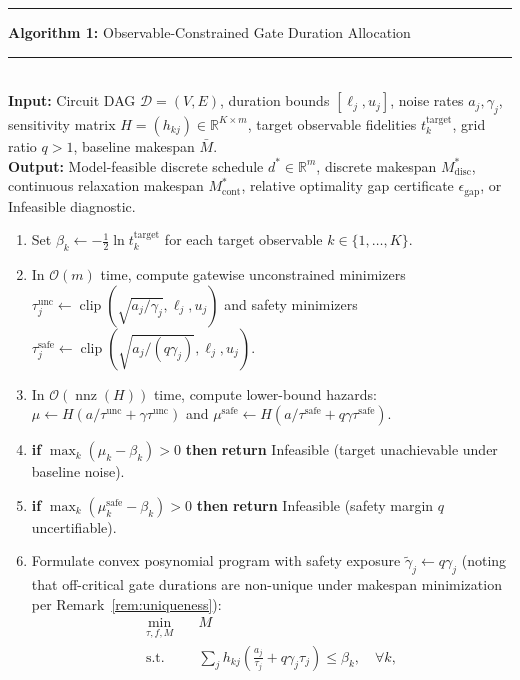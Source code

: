 \documentclass[10pt,letterpaper,journal]{IEEEtran}
\begin{document}
\begin{table}[t]
\hrule\vspace{3pt}
\noindent\textbf{Algorithm 1:} Observable-Constrained Gate Duration Allocation\\[-0.5em]
\rule{\columnwidth}{0.4pt}\\[0.2em]
\footnotesize
\textbf{Input:} Circuit DAG $\mathcal{D}=(V, E)$, duration bounds $[\ell_j, u_j]$, noise rates $a_j, \gamma_j$, sensitivity matrix $H = (h_{kj}) \in \mathbb{R}^{K \times m}$, target observable fidelities $t_k^{\mathrm{target}}$, grid ratio $q > 1$, baseline makespan $\bar{M}$.\\
\textbf{Output:} Model-feasible discrete schedule $d^* \in \mathbb{R}^m$, discrete makespan $M_{\mathrm{disc}}^*$, continuous relaxation makespan $M_{\mathrm{cont}}^*$, relative optimality gap certificate $\epsilon_{\mathrm{gap}}$, or Infeasible diagnostic.
\begin{enumerate}
\itemsep 0.05em
\item Set $\beta_k \gets -\frac{1}{2} \ln t_k^{\mathrm{target}}$ for each target observable $k \in \{1, \dots, K\}$.
\item In $\mathcal{O}(m)$ time, compute gatewise unconstrained minimizers $\tau_j^{\mathrm{unc}} \gets \operatorname{clip}(\sqrt{a_j/\gamma_j}, \ell_j, u_j)$ and safety minimizers $\tau_j^{\mathrm{safe}} \gets \operatorname{clip}(\sqrt{a_j/(q\gamma_j)}, \ell_j, u_j)$.
\item In $\mathcal{O}(\operatorname{nnz}(H))$ time, compute lower-bound hazards:
$\mu \gets H(a/\tau^{\mathrm{unc}} + \gamma\tau^{\mathrm{unc}})$ and $\mu^{\mathrm{safe}} \gets H(a/\tau^{\mathrm{safe}} + q\gamma\tau^{\mathrm{safe}})$.
\item \textbf{if} $\max_k (\mu_k - \beta_k) > 0$ \textbf{then} \textbf{return} Infeasible (target unachievable under baseline noise).
\item \textbf{if} $\max_k (\mu_k^{\mathrm{safe}} - \beta_k) > 0$ \textbf{then} \textbf{return} Infeasible (safety margin $q$ uncertifiable).
\item Formulate convex posynomial program with safety exposure $\tilde{\gamma}_j \gets q\gamma_j$ (noting that off-critical gate durations are non-unique under makespan minimization per Remark~\ref{rem:uniqueness}):
\begin{equation*}
\begin{aligned}
\min_{\tau, f, M} \quad & M\\
\text{s.t.} \quad & \sum_{j} h_{kj} \left(\frac{a_j}{\tau_j} + q\gamma_j \tau_j\right) \le \beta_k, \quad \forall k,\\

\end{aligned}
\end{equation*}
\end{enumerate}
\end{table}
\end{document}

